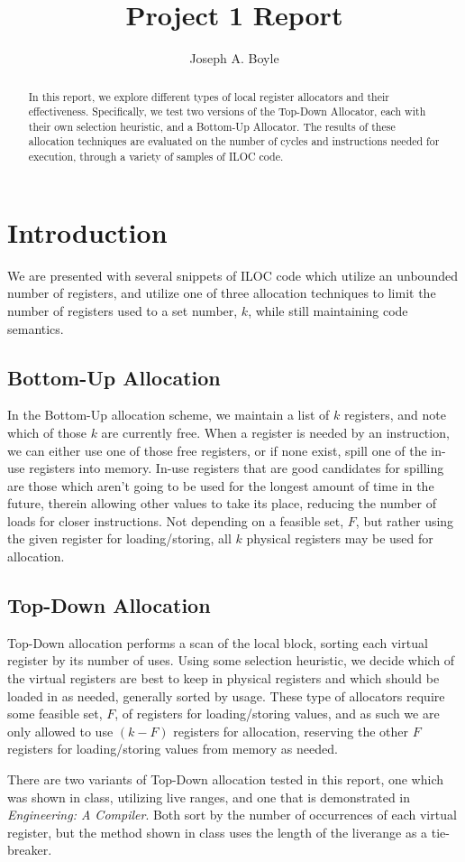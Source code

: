 \documentclass[answers]{exam}
\date{\duedate}
\title{Project 1 Report}
\author{Joseph A. Boyle}
\begin{document}
\maketitle
\begin{abstract}
In this report, we explore different types of local register allocators and their effectiveness. Specifically, we test two versions of the Top-Down Allocator, each with their own selection heuristic, and a Bottom-Up Allocator. The results of these allocation techniques are evaluated on the number of cycles and instructions needed for execution, through a variety of samples of ILOC code.
\end{abstract}

\section{Introduction}
	We are presented with several snippets of ILOC code which utilize an unbounded number of registers, and utilize one of three allocation techniques to limit the number of registers used to a set number, $k$, while still maintaining code semantics. 
	\subsection{Bottom-Up Allocation}
		In the Bottom-Up allocation scheme, we maintain a list of $k$ registers, and note which of those $k$ are currently free. When a register is needed by an instruction, we can either use one of those free registers, or if none exist, spill one of the in-use registers into memory. In-use registers that are good candidates for spilling are those which aren't going to be used for the longest amount of time in the future, therein allowing other values to take its place, reducing the number of loads for closer instructions. Not depending on a feasible set, $F$, but rather using the given register for loading/storing, all $k$ physical registers may be used for allocation.
		
	\subsection{Top-Down Allocation}
		Top-Down allocation performs a scan of the local block, sorting each virtual register by its number of uses. Using some selection heuristic, we decide which of the virtual registers are best to keep in physical registers and which should be loaded in as needed, generally sorted by usage. These type of allocators require some feasible set, $F$, of registers for loading/storing values, and as such we are only allowed to use $(k-F)$ registers for allocation, reserving the other $F$ registers for loading/storing values from memory as needed. 
		
		There are two variants of Top-Down allocation tested in this report, one which was shown in class, utilizing live ranges, and one that is demonstrated in \textit{Engineering: A Compiler}. Both sort by the number of occurrences of each virtual register, but the method shown in class uses the length of the liverange as a tie-breaker.
\end{document}

